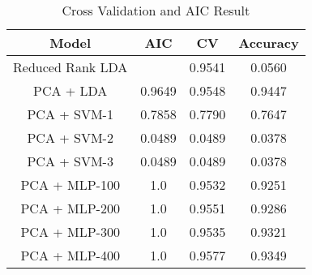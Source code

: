 \begin{table}
    \centering
    \caption[short]{Cross Validation and AIC Result}
    \label{tab:cv-result}
    \begin{tabular}{c|ccc}
        \hline\hline
        Model & AIC & CV & Accuracy\\ \hline\hline
        Reduced Rank LDA &  & 0.9541 & 0.0560 \\
        PCA + LDA & 0.9649 & 0.9548 & 0.9447 \\
        PCA + SVM-1 & 0.7858 & 0.7790 & 0.7647 \\
        PCA + SVM-2 & 0.0489 & 0.0489 & 0.0378 \\
        PCA + SVM-3 & 0.0489 & 0.0489 & 0.0378 \\
        PCA + MLP-100 & 1.0 & 0.9532 & 0.9251 \\
        PCA + MLP-200 & 1.0 & 0.9551 & 0.9286 \\
        PCA + MLP-300 & 1.0 & 0.9535 & 0.9321 \\
        PCA + MLP-400 & 1.0 & 0.9577 & 0.9349 \\
        \hline\hline
    \end{tabular}
\end{table}